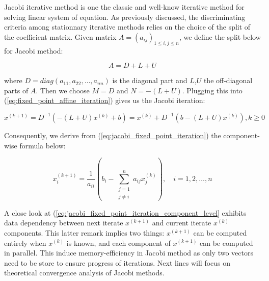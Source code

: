 Jacobi iterative method is one the classic and well-know iterative method for solving linear system of equation. As previously discussed, the discriminating criteria among stationnary iterative methods relies on the choice of the split of the coefficient matrix. Given matrix $A = {(a_{ij})}_{1\leq i,j\leq n}$, we define the split below for Jacobi method:

\begin{equation}
    A = D + L + U
    \label{eq:split_of_A}
\end{equation}

where $D=diag(a_{11},a_{22},\ldots,a_{nn})$ is the diagonal part and $L$,$U$ the off-diagonal parts of $A$. Then we choose $M = D$ and $N=-(L+U)$. Plugging this into (\ref{eq:fixed_point_affine_iteration}) gives us the Jacobi iteration:

\begin{equation}
    x^{(k+1)} = D^{-1}(-(L+U) x^{(k)} + b) = x^{(k)} + D^{-1}(b - (L+U)x^{(k)}) , k \geq 0
    \label{eq:jacobi_fixed_point_iteration}
\end{equation}

Consequently, we derive from (\ref{eq:jacobi_fixed_point_iteration}) the component-wise formula below:

\begin{equation}
    x^{(k+1)}_i = \frac{1}{a_{ii}} \left( b_i - \sum_{\substack{j=1 \\ j \ne i}}^{n} a_{ij} x^{(k)}_j \right), \quad i = 1, 2, \ldots, n
    \label{eq:jacobi_fixed_point_iteration_component_level}
\end{equation}

A close look at (\ref{eq:jacobi_fixed_point_iteration_component_level} exhibits data dependency between next iterate $x^{(k+1)}$ and current iterate $x^{(k)}$ components. This latter remark implies two things: $x^{(k+1)}$ can be computed entirely when $x^{(k)}$ is known, and each component of $x^{(k+1)}$ can be computed in parallel. This induce memory-efficiency in Jacobi method as only two vectors need to be store to ensure progress of iterations. Next lines will focus on theoretical convergence analysis of Jacobi methods.

